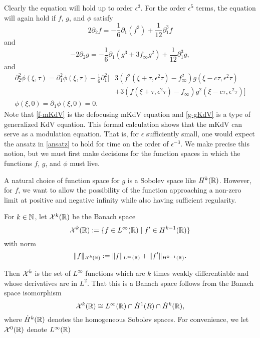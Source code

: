 Clearly the equation will hold up to order \(\epsilon^3\). For the order \(\epsilon^5\) terms, the equation will again hold if \(f\), \(g\), and \(\phi\) satisfy
\begin{equation}\label{f-mKdV}
	2 \partial_2 f = - \frac 1 6 \partial_1(f^3) + \frac 1 {12} \partial_1^3 f
\end{equation}
and 
\begin{equation}\label{g-gKdV}
	-2 \partial_2 g = - \frac 1 6 \partial_1 (g^3 + 3f_\infty g^2) + \frac 1 {12}\partial_1^3 g,
\end{equation}
and
\begin{equation}\label{phi-pde}
	\begin{aligned}
		\partial_2^2 \phi(\xi, \tau) = \partial_1^2\phi(\xi, \tau)- \frac 1 6 \partial_1^2 \big[& 3(f^2(\xi+\tau,\epsilon^2\tau)-f_\infty^2)g(\xi-c\tau,\epsilon^2\tau) \\&+ 3 (f(\xi+\tau,\epsilon^2\tau)-f_\infty)g^2(\xi-c\tau,\epsilon^2\tau) \big ] \\
		\phi(\xi,0) = \partial_1 \phi(\xi, 0) = 0.
	\end{aligned}
\end{equation}
Note that \cref{f-mKdV} is the defocusing mKdV equation and \cref{g-gKdV} is a type of generalized KdV equation. This formal calculation shows that the mKdV can serve as a modulation equation. That is, for \(\epsilon\) sufficiently small, one would expect the ansatz in \cref{ansatz} to hold for time on the order of \(\epsilon^{-3}\). We make precise this notion, but we must first make decisions for the function spaces in which the functions \(f\), \(g\), and \(\phi\) must live.

A natural choice of function space for \(g\) is a Sobolev space like \(H^k(\mathbb{R})\). However, for \(f\), we want to allow the possibility of the function approaching a non-zero limit at positive and negative infinity while also having sufficient regularity. 
\begin{defn}
	For \(k\in\mathbb{N}\), let \(\mathcal{X}^k(\mathbb{R})\) be the Banach space 
	\begin{equation}
		\mathcal{X}^k(\mathbb{R}) := \{f \in L^\infty(\mathbb{R}) \mid f'\in H^{k-1}(\mathbb{R})\}
	\end{equation}
	with norm
	\begin{equation}
		\| f \|_{\mathcal{X}^k(\mathbb{R})} := \| f \|_{L^\infty(\mathbb{R})} + \| f' \|_{H^{k-1}(\mathbb{R})}.
	\end{equation}
\end{defn}
Then \(\mathcal{X}^k\) is the set of \(L^\infty\) functions which are \(k\) times weakly differentiable and whose derivatives are in \(L^2\). That this is a Banach space follows from the Banach space isomorphism
\begin{equation}
	\mathcal{X}^k(\mathbb{R}) \cong L^\infty(\mathbb{R}) \cap \dot H^1(R) \cap \dot H^k(\mathbb{R}),
\end{equation}
where \(\dot H^k(\mathbb{R})\) denotes the homogeneous Sobolev spaces. For convenience, we let \(\mathcal{X}^0(\mathbb{R})\) denote \(L^\infty(\mathbb{R})\)

